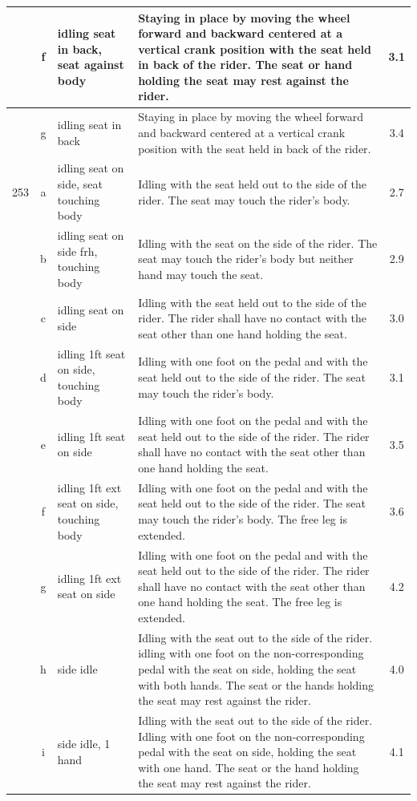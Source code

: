 \begin{longtable}{|r|c|p{4cm}|p{8cm}|c|}
\hline
  & f & idling seat in back, seat against body  & Staying in place by moving the wheel forward and backward centered at a vertical crank position with the seat held in back of the rider. The seat or hand holding the seat may rest against the rider.  & 3.1 \\ 
\hline
  & g & idling seat in back & Staying in place by moving the wheel forward and backward centered at a vertical crank position with the seat held in back of the rider.  & 3.4 \\ 
\hline
253 & a & idling seat on side, seat touching body & Idling with the seat held out to the side of the rider. The seat may touch the rider’s body.  & 2.7 \\ 
\hline
  & b & idling seat on side frh, touching body  & Idling with the seat on the side of the rider. The seat may touch the rider’s body but neither hand may touch the seat. & 2.9 \\ 
\hline
  & c & idling seat on side & Idling with the seat held out to the side of the rider. The rider shall have no contact with the seat other than one hand holding the seat. & 3.0 \\ 
\hline
  & d & idling 1ft seat on side, touching body  & Idling with one foot on the pedal and with the seat held out to the side of the rider. The seat may touch the rider’s body. & 3.1 \\ 
\hline
  & e & idling 1ft seat on side & Idling with one foot on the pedal and with the seat held out to the side of the rider. The rider shall have no contact with the seat other than one hand holding the seat.  & 3.5 \\ 
\hline
  & f & idling 1ft ext seat on side, touching body  & Idling with one foot on the pedal and with the seat held out to the side of the rider. The seat may touch the rider’s body. The free leg is extended. & 3.6 \\ 
\hline
  & g & idling 1ft ext seat on side & Idling with one foot on the pedal and with the seat held out to the side of the rider. The rider shall have no contact with the seat other than one hand holding the seat. The free leg is extended.  & 4.2 \\ 
\hline
  & h & side idle & Idling with the seat out to the side of the rider. idling with one foot on the non-corresponding pedal with the seat on side, holding the seat with both hands. The seat or the hands holding the seat may rest against the rider.  & 4.0 \\ 
\hline
  & i & side idle, 1 hand & Idling with the seat out to the side of the rider. Idling with one foot on the non-corresponding pedal with the seat on side, holding the seat with one hand. The seat or the hand holding the seat may rest against the rider. & 4.1 \\ 

\end{longtable}

